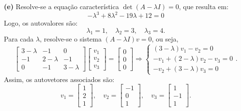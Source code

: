 \begin{resolution}
  {\bf (e)} \;
  Resolve-se a equação característica \( \det(A - \lambda I) = 0 \), que resulta em:
  \[
    -\lambda^3+8\lambda^2-19\lambda+12 = 0
  \]
  Logo, os autovalores são:
  \[
    \lambda_1 = 1, \quad \lambda_2 = 3, \quad \lambda_3 = 4.
  \]
  Para cada \(\lambda\), resolve-se o sistema \((A - \lambda I)v = 0\), ou seja,
  $$
    \begin{bmatrix}
      3 - \lambda & -1 & 0 \\ -1 & 2 - \lambda & -1 \\ 0 & -1 & 3 - \lambda
    \end{bmatrix} \begin{bmatrix}
      v_1 \\ v_2 \\ v_3
    \end{bmatrix} = \begin{bmatrix}
      0 \\ 0 \\ 0
    \end{bmatrix} \Rightarrow
    \begin{cases}
      (3 - \lambda) v_1 - v_2 = 0        \\
      -v_1 + (2 - \lambda) v_2 - v_3 = 0 \\
      -v_2 + (3 - \lambda) v_3 = 0
    \end{cases}.
  $$
  Assim, os autovetores associados são:
  \[
    v_1 = \begin{bmatrix} 1 \\ 2 \\ 1\end{bmatrix}, \quad
    v_2 = \begin{bmatrix} -1 \\ 0 \\ 1\end{bmatrix}, \quad
    v_3 = \begin{bmatrix} 1 \\ -1 \\ 1 \end{bmatrix}.
  \]


\end{resolution}
